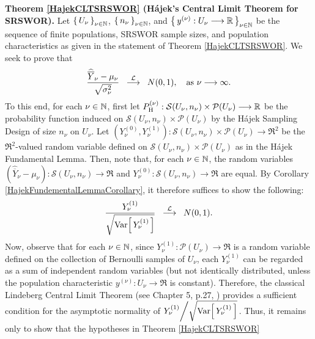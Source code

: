\vskip 0.5cm
\proofof \textbf{Theorem \ref{HajekCLTSRSWOR} (H\'ajek's Central Limit Theorem for SRSWOR).}
\vskip 0.2cm
\noindent
Let $\left\{\,U_{\nu}\,\right\}_{\nu\in\N}$, $\left\{\,n_{\nu}\,\right\}_{\nu\in\N}$, and
$\left\{\,y^{(\nu)} : U_{\nu} \longrightarrow \Re\,\right\}_{\nu\in\N}$
be the sequence of finite populations, SRSWOR sample sizes, and
population characteristics
as given in the statement of Theorem \ref{HajekCLTSRSWOR}.
We seek to prove that
\begin{equation*}
\dfrac{\widehat{\overline{Y}}_{\nu} - \mu_{\nu}}{\sqrt{\sigma^{2}_{\nu}}}
\;\;\overset{\mathcal{L}}{\longrightarrow}\;\;
N(0,1),
\quad
\textnormal{as $\nu\longrightarrow\infty$}.
\end{equation*}
To this end, for each $\nu \in \N$, first let 
$P_{\textnormal{H}}^{(\nu)} : \mathcal{S}(U_{\nu},n_{\nu}) \times \mathcal{P}(U_{\nu}) \longrightarrow \Re$
be the probability function induced on $\mathcal{S}(U_{\nu},n_{\nu}) \times \mathcal{P}(U_{\nu})$
by the H\'ajek Sampling Design of size $n_{\nu}$ on $U_{\nu}$.
Let $\left(Y^{(0)}_{\nu},Y^{(1)}_{\nu}\right) : \mathcal{S}(U_{\nu},n_{\nu}) \times \mathcal{P}(U_{\nu}) \longrightarrow\Re^{2}$
be the $\Re^{2}$-valued random variable defined on $\mathcal{S}(U_{\nu},n_{\nu}) \times \mathcal{P}(U_{\nu})$
as in the H\'ajek Fundamental Lemma.
Then, note that, for each $\nu\in\N$, the random variables
$\left(\widehat{\overline{Y}}_{\nu} - \mu_{\nu}\right) : \mathcal{S}(U_{\nu},n_{\nu}) \longrightarrow \Re$ and
$Y^{(0)}_{\nu} : \mathcal{S}(U_{\nu},n_{\nu}) \longrightarrow \Re$
are equal.
By Corollary \ref{HajekFundementalLemmaCorollary}, it therefore suffices to show the following:
\begin{equation*}
\dfrac{Y^{(1)}_{\nu}}{\sqrt{\Var\!\left[\,Y^{(1)}_{\nu}\,\right]}} \;\; \overset{\mathcal{L}}{\longrightarrow} \;\; N(0,1).
\end{equation*}
Now, observe that for each $\nu\in\N$,
since $Y^{(1)}_{\nu} : \mathcal{P}(U_{\nu}) \longrightarrow \Re$ is a random variable
defined on the collection of Bernoulli samples of $U_{\nu}$,
each $Y^{(1)}_{\nu}$ can be regarded as a sum of independent random variables
(but not identically distributed, unless the population characteristic
$y^{(\nu)} : U_{\nu} \longrightarrow \Re$ is constant).
Therefore, the classical Lindeberg Central Limit Theorem
(see Chapter 5, p.27, \cite{Ferguson1996})
provides a sufficient condition for
the asymptotic normality of $Y^{(1)}_{\nu}\!\left/\sqrt{\Var\!\left[\,Y^{(1)}_{\nu}\,\right]}\right.$.
Thus, it remains only to show that the hypotheses in Theorem \ref{HajekCLTSRSWOR}
